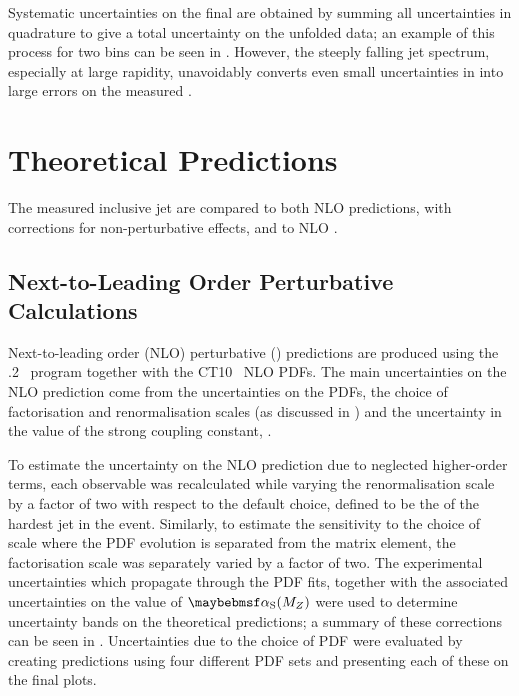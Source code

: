 Systematic uncertainties on the final \xs are obtained by summing all
uncertainties in quadrature to give a total uncertainty on the unfolded data; an
example of this process for two \absRap bins can be seen in .
However, the steeply falling jet \pT spectrum, especially at large rapidity,
unavoidably converts even small uncertainties in \pT into large errors on the
measured \xs.

\section{Theoretical Predictions}
\label{sec:forward-inclusive:theory_predictions}
The measured inclusive jet  are compared to both NLO \pQCD predictions,
with corrections for non-perturbative effects, and to NLO \MC.

\subsection{Next-to-Leading Order Perturbative \QCD Calculations}
\label{sec:forward-inclusive:NLOpQCD}
Next-to-leading order (NLO) perturbative \QCD (\pQCD) predictions are produced using the .2~\cite{Nagy:2003:NLOjet}
program together with the CT10~\cite{Lai:2010:LHAPDF_CT10} NLO PDFs. The main uncertainties
on the NLO prediction come from the uncertainties on the PDFs, the choice of factorisation
and renormalisation scales (as discussed in )
and the uncertainty in the value of the strong coupling constant, \alphaS.

To estimate the uncertainty on the NLO prediction due to neglected higher-order
terms, each observable was recalculated while varying the renormalisation scale
by a factor of two with respect to the default choice, defined to be the \pT of
the hardest jet in the event. Similarly, to estimate the sensitivity to the choice
of scale where the PDF evolution is separated from the matrix element, the factorisation
scale was separately varied by a factor of two. The experimental uncertainties which
propagate through the PDF fits, together with the associated uncertainties on the
value of $\alphaS(M_Z)$ were used to determine uncertainty bands on the theoretical
predictions; a summary of these corrections can be seen in .
Uncertainties due to the choice of PDF were evaluated by creating predictions using
four different PDF sets and presenting each of these on the final plots.

